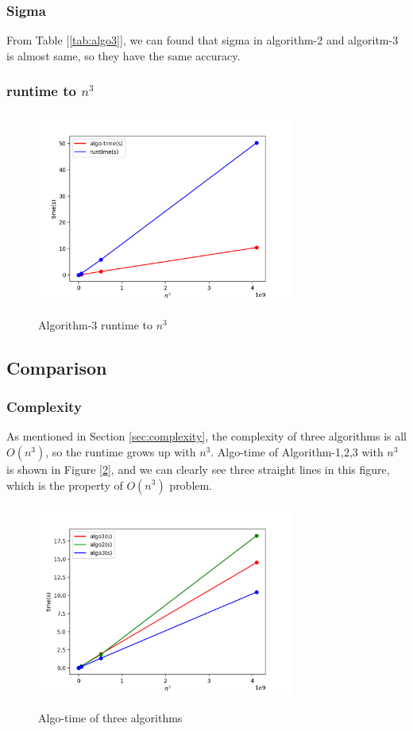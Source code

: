 \documentclass{article}
\begin{document}
\subsubsection{Sigma}
From Table [\ref{tab:algo3}], we can found that sigma in algorithm-2 and algoritm-3 is almost same, so they have the same accuracy.
\subsubsection{runtime to $n^3$}
\begin{figure}[H]
    \centering
    \caption{Algorithm-3 runtime to $n^3$}
    \includegraphics[width=0.75\textwidth]{src/algo3-runtime.png}
    \label{fig:algo3-runtime}
\end{figure}

\subsection{Comparison}
\subsubsection{Complexity}
As mentioned in Section \ref{sec:complexity}, the complexity of three algorithms is all {\boldmath$O(n^3)$}, so the runtime grows 
up with $n^3$. Algo-time of Algorithm-1,2,3 with $n^3$ is shown in Figure [\ref{fig:total-compare}], and we can clearly see three 
straight lines in this figure, which is the property of {\boldmath$O(n^3)$} problem.
\begin{figure}[H]
    \centering
    \caption{Algo-time of three algorithms}
    \includegraphics[width=0.75\textwidth]{src/total_compare.png}
    \label{fig:total-compare}
\end{figure}
\end{document}
